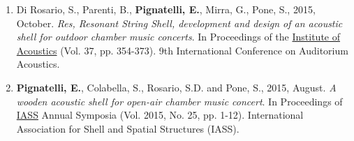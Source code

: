 \begin{enumerate}[leftmargin=0.45cm, itemsep=0em, topsep=0.5em, parsep=0.2em]
    \item Di Rosario, S., Parenti, B., \textbf{Pignatelli, E.}, Mirra, G., Pone, S., 2015, October. \textit{Res, Resonant String Shell, development and design of an acoustic shell for outdoor chamber music concerts}. In Proceedings of the \underline{Institute of Acoustics} (Vol. 37, pp. 354-373). 9th International Conference on Auditorium Acoustics.
    \item \textbf{Pignatelli, E.}, Colabella, S., Rosario, S.D. and Pone, S., 2015, August. \textit{A wooden acoustic shell for open-air chamber music concert}. In Proceedings of \underline{IASS} Annual Symposia (Vol. 2015, No. 25, pp. 1-12). International Association for Shell and Spatial Structures (IASS).
\end{enumerate}
